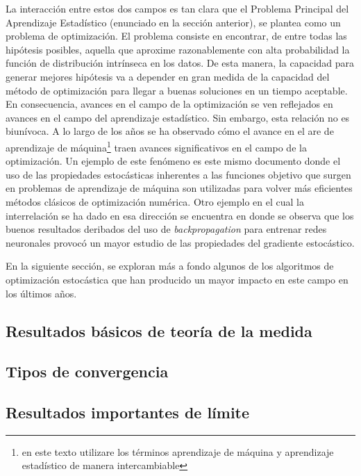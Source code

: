 \documentclass{book}
\theoremstyle{plain}
\theoremstyle{definition}
\theoremstyle{remark}
\begin{document}
La interacción entre estos dos campos es tan clara que el Problema Principal del Aprendizaje Estadístico (enunciado en la sección anterior),  se plantea como un problema de optimización. El problema consiste en encontrar, de entre todas las hipótesis posibles, aquella que aproxime razonablemente con alta probabilidad la función de distribución intrínseca en los datos. De esta manera, la capacidad para generar mejores hipótesis va a depender en gran medida de la capacidad del método de optimización para llegar a buenas soluciones en un tiempo aceptable. En consecuencia, avances en el campo de la optimización se ven reflejados en avances en el campo del aprendizaje estadístico. Sin embargo, esta relación no es biunívoca. A lo largo de los años se ha observado cómo el avance en el are de aprendizaje de máquina\footnote{en este texto utilizare los términos aprendizaje de máquina y aprendizaje estadístico de manera intercambiable} traen avances significativos en el campo de la optimización. Un ejemplo de este fenómeno es este mismo documento donde el uso de las propiedades estocásticas inherentes a las funciones objetivo que surgen en problemas de aprendizaje de máquina son utilizadas para volver más eficientes métodos clásicos de optimización numérica. Otro ejemplo en el cual la interrelación se ha dado en esa dirección se encuentra en \cite{BENNETT} donde se observa que los buenos resultados deribados del uso  de \emph{backpropagation} para entrenar redes neuronales provocó un mayor estudio de las propiedades del gradiente estocástico. 

En la siguiente sección, se exploran más a fondo algunos de los algoritmos de optimización estocástica que han producido un mayor impacto en este campo en los últimos años. 


\begin{subappendices}

\section{Resultados básicos de teoría de la medida}

\subsection{Tipos de convergencia}

\subsection{Resultados importantes de límite}



\end{subappendices}
\end{document}
